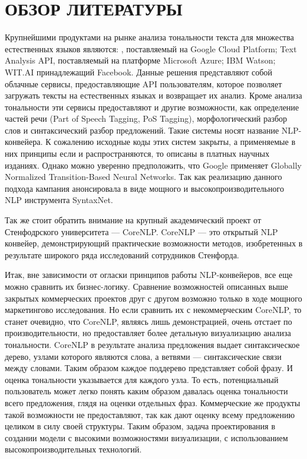 \section{ОБЗОР ЛИТЕРАТУРЫ}
\label{sec:domain}

Крупнейшими продуктами на рынке анализа тональности текста для множества естественных языков являются: , поставляемый на Google Cloud Platform; Text Analysis API, поставляемый на платформе Microsoft Azure; IBM Watson; WIT.AI принадлежащий Facebook. Данные решения представляют собой облачные сервисы, предоставляющие API пользователям, которое позволяет загружать тексты на естественных языках и возвращает их анализ. Кроме анализа тональности эти сервисы предоставляют и другие возможности, как определение частей речи (Part of Speech Tagging, PoS Tagging), морфологический разбор слов и синтаксический разбор предложений. Такие системы носят название NLP-конвейера. К сожалению исходные коды этих систем закрыты, а применяемые в них принципы если и распространяются, то описаны в платных научных изданиях. Однако можно уверенно предположить, что Google применяет Globally Normalized Transition-Based Neural Networks\cite{google_gntb}. Так как реализацию данного подхода кампания анонсировала в виде мощного и высокопроизводительного NLP инструмента SyntaxNet.

Так же стоит обратить внимание на крупный академический проект от Стенфодрского университета --- CoreNLP\@. CoreNLP --- это открытый NLP конвейер, демонстрирующий практические возможности методов, изобретенных в результате широкого ряда исследований сотрудников Стенфорда.

Итак, вне зависимости от огласки принципов работы NLP-конвейеров, все еще можно сравнить их бизнес-логику. Сравнение возможностей описанных выше закрытых коммерческих проектов друг с другом возможно только в ходе мощного маркетингово исследования. Но если сравнить их с некоммерческим CoreNLP, то станет очевидно, что CoreNLP, являясь лишь демонстрацией, очень отстает по производительности, но предоставляет более детальную визуализацию анализа тональности. CoreNLP в результате анализа предложения выдает синтаксическое дерево, узлами которого являются слова, а ветвями --- синтаксические связи между словами. Таким образом каждое поддерево представляет собой фразу. И оценка тональности указывается для каждого узла. То есть, потенциальный пользователь может легко понять каким образом давалась оценка тональности всего предложения, глядя на оценки отдельных фраз. Коммерческие же продукты такой возможности не предоставляют, так как дают оценку всему предложению целиком в силу своей структуры. Таким образом, задача проектирования в создании модели с высокими возможностями визуализации, с использованием высокопроизводительных технологий.

